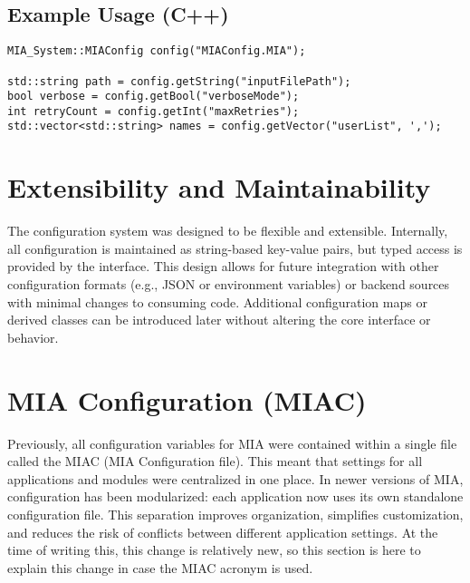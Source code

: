 \subsection*{Example Usage (C++)}

\begin{lstlisting}[style=cppstyle]
MIA_System::MIAConfig config("MIAConfig.MIA");

std::string path = config.getString("inputFilePath");
bool verbose = config.getBool("verboseMode");
int retryCount = config.getInt("maxRetries");
std::vector<std::string> names = config.getVector("userList", ',');
\end{lstlisting}

\section{Extensibility and Maintainability}

The configuration system was designed to be flexible and extensible. Internally, all configuration is maintained as string-based key-value pairs, but typed access is provided by the interface. This design allows for future integration with other configuration formats (e.g., JSON or environment variables) or backend sources with minimal changes to consuming code. Additional configuration maps or derived classes can be introduced later without altering the core interface or behavior.

\section{MIA Configuration (MIAC)}

Previously, all configuration variables for MIA were contained within a single file called the MIAC (MIA Configuration file). This meant that settings for all applications and modules were centralized in one place. In newer versions of MIA, configuration has been modularized: each application now uses its own standalone configuration file. This separation improves organization, simplifies customization, and reduces the risk of conflicts between different application settings. At the time of writing this, this change is relatively new, so this section is here to explain this change in case the MIAC acronym is used.
